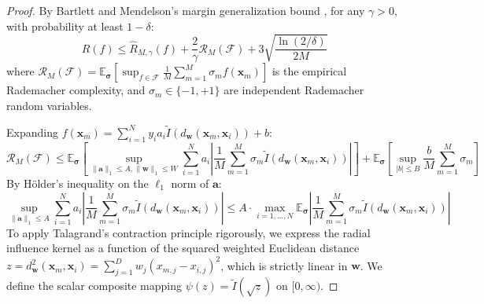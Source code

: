 \documentclass[times, review, 10pt]{elsarticle}
\begin{document}
\begin{proof}
By Bartlett and Mendelson's margin generalization bound \cite{bartlett2002rademacher}, for any $\gamma > 0$, with probability at least $1 - \delta$:
\begin{equation}
R(f) \le \hat{R}_{M,\gamma}(f) + \frac{2}{\gamma} \mathcal{R}_M(\mathcal{F}) + 3 \sqrt{\frac{\ln(2/\delta)}{2M}}
\label{eq:rademacher_base}
\end{equation}
where $\mathcal{R}_M(\mathcal{F}) = \mathbb{E}_{\boldsymbol{\sigma}}\left[ \sup_{f \in \mathcal{F}} \frac{1}{M} \sum_{m=1}^M \sigma_m f(\mathbf{x}_m) \right]$ is the empirical Rademacher complexity, and $\sigma_m \in \{-1, +1\}$ are independent Rademacher random variables.

Expanding $f(\mathbf{x}_m) = \sum_{i=1}^N y_i a_i \tilde{I}(d_{\mathbf{w}}(\mathbf{x}_m, \mathbf{x}_i)) + b$:
\begin{equation}
\mathcal{R}_M(\mathcal{F}) \le \mathbb{E}_{\boldsymbol{\sigma}}\left[ \sup_{\|\mathbf{a}\|_1 \le A, \|\mathbf{w}\|_1 \le W} \sum_{i=1}^N a_i \left| \frac{1}{M}\sum_{m=1}^M \sigma_m \tilde{I}(d_{\mathbf{w}}(\mathbf{x}_m, \mathbf{x}_i)) \right| \right] + \mathbb{E}_{\boldsymbol{\sigma}}\left[ \sup_{|b| \le B} \frac{b}{M}\sum_{m=1}^M \sigma_m \right]
\end{equation}
By H\"older's inequality on the $\ell_1$ norm of $\mathbf{a}$:
\begin{equation}
\sup_{\|\mathbf{a}\|_1 \le A} \sum_{i=1}^N a_i \left| \frac{1}{M}\sum_{m=1}^M \sigma_m \tilde{I}(d_{\mathbf{w}}(\mathbf{x}_m, \mathbf{x}_i)) \right| \le A \cdot \max_{i=1,\dots,N} \mathbb{E}_{\boldsymbol{\sigma}}\left| \frac{1}{M}\sum_{m=1}^M \sigma_m \tilde{I}(d_{\mathbf{w}}(\mathbf{x}_m, \mathbf{x}_i)) \right|
\end{equation}
To apply Talagrand's contraction principle rigorously, we express the radial influence kernel as a function of the squared weighted Euclidean distance $z = d_{\mathbf{w}}^2(\mathbf{x}_m, \mathbf{x}_i) = \sum_{j=1}^D w_j (x_{m,j} - x_{i,j})^2$, which is strictly linear in $\mathbf{w}$. We define the scalar composite mapping $\psi(z) = \tilde{I}(\sqrt{z})$ on $[0, \infty)$. 


\end{proof}
\end{document}
